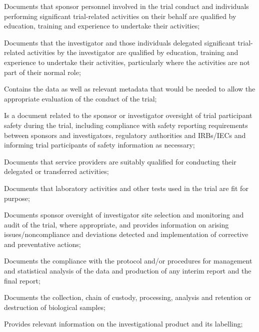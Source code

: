 \documentclass[11pt]{article}
\begin{document}
\begin{description}[leftmargin=2.5cm,style=sameline]
\item[(l)] Documents that sponsor personnel involved in the trial conduct and individuals performing significant trial-related activities on their behalf are qualified by education, training and experience to undertake their activities;

\item[(m)] Documents that the investigator and those individuals delegated significant trial-related activities by the investigator are qualified by education, training and experience to undertake their activities, particularly where the activities are not part of their normal role;

\item[(n)] Contains the data as well as relevant metadata that would be needed to allow the appropriate evaluation of the conduct of the trial;

\item[(o)] Is a document related to the sponsor or investigator oversight of trial participant safety during the trial, including compliance with safety reporting requirements between sponsors and investigators, regulatory authorities and IRBs/IECs and informing trial participants of safety information as necessary;

\item[(p)] Documents that service providers are suitably qualified for conducting their delegated or transferred activities;

\item[(q)] Documents that laboratory activities and other tests used in the trial are fit for purpose;

\item[(r)] Documents sponsor oversight of investigator site selection and monitoring and audit of the trial, where appropriate, and provides information on arising issues/noncompliance and deviations detected and implementation of corrective and preventative actions;

\item[(s)] Documents the compliance with the protocol and/or procedures for management and statistical analysis of the data and production of any interim report and the final report;

\item[(t)] Documents the collection, chain of custody, processing, analysis and retention or destruction of biological samples;

\item[(u)] Provides relevant information on the investigational product and its labelling;


\end{description}
\end{document}
